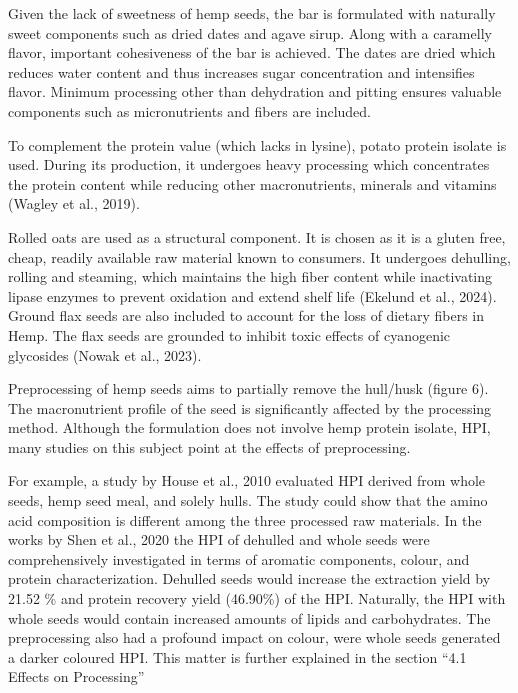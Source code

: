 \vspace{1em}
Given the lack of sweetness of hemp seeds, the bar is formulated with naturally sweet components such as dried dates and agave sirup. Along with a caramelly flavor, important cohesiveness of the bar is achieved. The dates are dried which reduces water content and thus increases sugar concentration and intensifies flavor. Minimum processing other than dehydration and pitting ensures valuable components such as micronutrients and fibers are included.

\vspace{1em}
To complement the protein value (which lacks in lysine), potato protein isolate is used. During its production, it undergoes heavy processing which concentrates the protein content while reducing other macronutrients, minerals and vitamins (Wagley et al., 2019).

\vspace{1em}
Rolled oats are used as a structural component. It is chosen as it is a gluten free, cheap, readily available raw material known to consumers. It undergoes dehulling, rolling and steaming, which maintains the high fiber content while inactivating lipase enzymes to prevent oxidation and extend shelf life (Ekelund et al., 2024). Ground flax seeds are also included to account for the loss of dietary fibers in Hemp. The flax seeds are grounded to inhibit toxic effects of cyanogenic glycosides (Nowak et al., 2023).

\vspace{1em}
Preprocessing of hemp seeds aims to partially remove the hull/husk (figure 6). The macronutrient profile of the seed is significantly affected by the processing method. Although the formulation does not involve hemp protein isolate, HPI, many studies on this subject point at the effects of preprocessing. 

\vspace{1em}
For example, a study by House et al., 2010 evaluated HPI derived from whole seeds, hemp seed meal, and solely hulls. The study could show that the amino acid composition is different among the three processed raw materials. In the works by Shen et al., 2020 the HPI of dehulled and whole seeds were comprehensively investigated in terms of aromatic components, colour, and protein characterization. Dehulled seeds would increase the extraction yield by 21.52 \% and protein recovery yield (46.90\%) of the HPI. Naturally, the HPI with whole seeds would contain increased amounts of lipids and carbohydrates. The preprocessing also had a profound impact on colour, were whole seeds generated a darker coloured HPI. This matter is further explained in the section “4.1 Effects on Processing”

